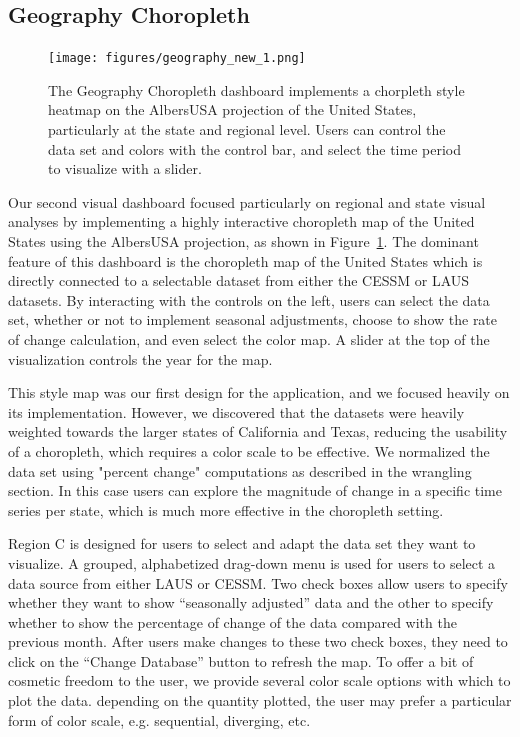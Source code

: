 \documentclass{sigchi}
\begin{document}
\subsection{Geography Choropleth}

\begin{figure}[!ht]
    \centering
    \texttt{[image: figures/geography\_new\_1.png]}
    \caption{The Geography Choropleth dashboard implements a chorpleth style heatmap on the AlbersUSA projection of the United States, particularly at the state and regional level. Users can control the data set and colors with the control bar, and select the time period to visualize with a slider.}
    \label{fig:Geography}
\end{figure}

Our second visual dashboard focused particularly on regional and state visual analyses by implementing a highly interactive choropleth map of the United States using the AlbersUSA projection, as shown in Figure~\ref{fig:Geography}. The dominant feature of this dashboard is the choropleth map of the United States which is directly connected to a selectable dataset from either the CESSM or LAUS datasets. By interacting with the controls on the left, users can select the data set, whether or not to implement seasonal adjustments, choose to show the rate of change calculation, and even select the color map. A slider at the top of the visualization controls the year for the map.

This style map was our first design for the application, and we focused heavily on its implementation. However, we discovered that the datasets were heavily weighted towards the larger states of California and Texas, reducing the usability of a choropleth, which requires a color scale to be effective. We normalized the data set using "percent change" computations as described in the wrangling section. In this case users can explore the magnitude of change in a specific time series per state, which is much more effective in the choropleth setting.

Region C is designed for users to select and adapt the data set they want to visualize. A grouped, alphabetized drag-down menu is used for users to select a data source from either LAUS or CESSM. Two check boxes allow users to specify whether they want to show ``seasonally adjusted'' data and the other to specify whether to show the percentage of change of the data compared with the previous month. After users make changes to these two check boxes, they need to click on the ``Change Database'' button to refresh the map. To offer a bit of cosmetic freedom to the user, we provide several color scale options with which to plot the data. depending on the quantity plotted, the user may prefer a particular form of color scale, e.g. sequential, diverging, etc.
\end{document}
